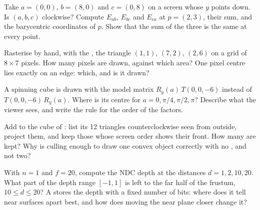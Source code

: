 \begin{exercise}[$\star$]\label{exo:b3:computer-graphics:3}
Take $a = (0, 0)$, $b = (8, 0)$ and $c = (0, 8)$ on a screen whose $y$ points down. Is $(a, b, c)$ clockwise? Compute $E_{ab}$, $E_{bc}$ and $E_{ca}$ at $p = (2, 3)$, their sum, and the barycentric coordinates of $p$. Show that the sum of the three  is the same at every point.
\end{exercise}

\begin{exercise}[$\star$]\label{exo:b3:computer-graphics:4}
Rasterise by hand, with the , the triangle $(1, 1)$, $(7, 2)$, $(2, 6)$ on a grid of $8 \times 7$ pixels. How many pixels are drawn, against which area? One pixel centre lies exactly on an edge: which, and is it drawn?
\end{exercise}

\begin{exercise}[$\star\star$]\label{exo:b3:computer-graphics:5}
A spinning cube is drawn with the model matrix $R_y(a)\,T(0, 0, -6)$ instead of $T(0, 0, -6)\,R_y(a)$. Where is its centre for $a = 0, \pi/4, \pi/2, \pi$? Describe what the viewer sees, and write the rule for the order of the factors.
\end{exercise}

\begin{exercise}[$\star\star$]\label{exo:b3:computer-graphics:6}
Add  to the cube of : list its 12 triangles counterclockwise seen from outside, project them, and keep those whose screen order shows their front. How many are kept? Why is culling enough to draw one convex object correctly with no , and not two?
\end{exercise}

\begin{exercise}[$\star\star$]\label{exo:b3:computer-graphics:7}
With $n = 1$ and $f = 20$, compute the NDC depth at the distances $d = 1, 2, 10, 20$. What part of the depth range $[-1, 1]$ is left to the far half of the frustum, $10 \leq d \leq 20$? A  stores the depth with a fixed number of bits: where does it tell near surfaces apart best, and how does moving the near plane closer change it?
\end{exercise}

